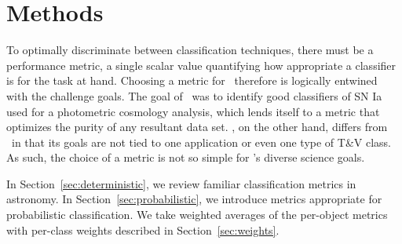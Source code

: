 \section{Methods}
\label{sec:methods}


To optimally discriminate between classification techniques, there must be a performance metric, a single scalar value quantifying how appropriate a classifier is for the task at hand.
Choosing a metric for \plasticc\ therefore is logically entwined with the challenge goals.
The goal of \snphotcc\ was to identify good classifiers of SN Ia used for a photometric cosmology analysis, which lends itself to a metric that optimizes the purity of any resultant data set.
\plasticc, on the other hand, differs from \snphotcc\ in that its goals are not tied to one application or even one type of T\&V class.
As such, the choice of a metric is not so simple for \plasticc's diverse science goals.


In Section~\ref{sec:deterministic}, we review familiar classification metrics in astronomy.
In Section~\ref{sec:probabilistic}, we introduce metrics appropriate for probabilistic classification.
We take weighted averages of the per-object metrics with per-class weights described in Section~\ref{sec:weights}.

